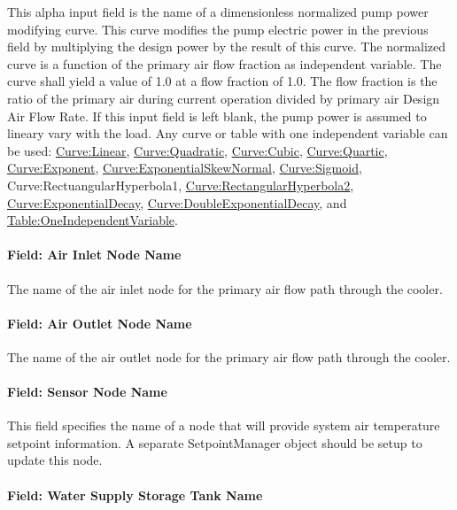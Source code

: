 This alpha input field is the name of a dimensionless normalized pump power modifying curve. This curve modifies the pump electric power in the previous field by multiplying the design power by the result of this curve. The normalized curve is a function of the primary air flow fraction as independent variable. The curve shall yield a value of 1.0 at a flow fraction of 1.0. The flow fraction is the ratio of the primary air during current operation divided by primary air Design Air Flow Rate. If this input field is left blank, the pump power is assumed to lineary vary with the load. Any curve or table with one independent variable can be used: \hyperref[curvelinear]{Curve:Linear}, \hyperref[curvequadratic]{Curve:Quadratic}, \hyperref[curvecubic]{Curve:Cubic}, \hyperref[curvequartic]{Curve:Quartic}, \hyperref[curveexponent]{Curve:Exponent}, \hyperref[curveexponentialskewnormal]{Curve:ExponentialSkewNormal}, \hyperref[curvesigmoid]{Curve:Sigmoid}, Curve:RectuangularHyperbola1, \hyperref[curverectangularhyperbola2]{Curve:RectangularHyperbola2}, \hyperref[curveexponentialdecay]{Curve:ExponentialDecay}, \hyperref[curvedoubleexponentialdecay]{Curve:DoubleExponentialDecay}, and \hyperref[tableoneindependentvariable]{Table:OneIndependentVariable}.

\paragraph{Field: Air Inlet Node Name}\label{field-air-inlet-node-name-1-001}

The name of the air inlet node for the primary air flow path through the cooler.

\paragraph{Field: Air Outlet Node Name}\label{field-air-outlet-node-name-1-000}

The name of the air outlet node for the primary air flow path through the cooler.

\paragraph{Field: Sensor Node Name}\label{field-sensor-node-name-001}

This field specifies the name of a node that will provide system air temperature setpoint information. A separate SetpointManager object should be setup to update this node.

\paragraph{Field: Water Supply Storage Tank Name}\label{field-water-supply-storage-tank-name-1}

